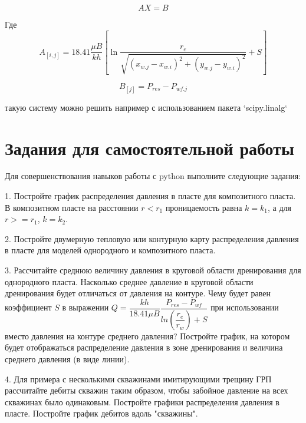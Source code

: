 $$AX = B$$

Где
$$
A_{[i,j]} = 18.41\dfrac{ \mu B }{kh} \left[ \ln\dfrac{r_e}{\sqrt{ (x_{w.j}-x_{w.i})^2 + (y_{w.j}-y_{w.i})^2 }} +S \right]
$$

$$
B_{[j]}=P_{res} - P_{wf.j}
$$

такую систему можно решить например с использованием пакета `scipy.linalg` 

\section{Задания для самостоятельной работы}

Для совершенствования навыков работы с python выполните следующие задания:

1. Постройте график распределения давления в пласте для композитного пласта. В композитном пласте на расстоянии $r<r_1$ проницаемость равна $k=k_1$, а для $r>=r_1$, $k=k_2$. 

2. Постройте двумерную тепловую или контурную карту распределения давления в пласте для моделей однородного и композитного пласта.

3. Рассчитайте среднюю величину давления в круговой области дренирования для однородного пласта. Насколько среднее давление в круговой области дренирования будет отличаться от давления на контуре. Чему будет равен коэффициент $S$ в выражении  $Q=\dfrac{kh}{18.41\mu B} \dfrac{P_{res}-P_{wf}}{ln(\dfrac{r_e}{r_w})+S}$ при использовании вместо давления на контуре среднего давления? Постройте график, на котором будет отображаться распределение давления в зоне дренирования и величина среднего давления (в виде линии).

4. Для примера с несколькими скважинами имитирующими трещину ГРП рассчитайте дебиты скважин таким образом, чтобы забойное давление на всех скважинах было одинаковым. Постройте графики распределения давления в пласте. Постройте график дебитов вдоль "скважины".

